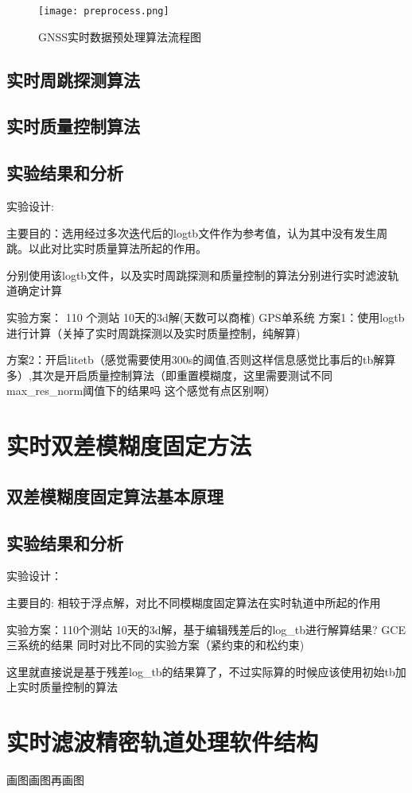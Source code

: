 \begin{figure}
  \centering
  \texttt{[image: preprocess.png]}
  \caption{GNSS实时数据预处理算法流程图}
  \label{fig:tb_flowchart}
\end{figure}

\subsection{实时周跳探测算法}

\subsection{实时质量控制算法}


\subsection{实验结果和分析}

实验设计:

主要目的：选用经过多次迭代后的log\underline{\space}tb文件作为参考值，认为其中没有发生周跳。以此对比实时质量算法所起的作用。

分别使用该log\underline{\space}tb文件，以及实时周跳探测和质量控制的算法分别进行实时滤波轨道确定计算

实验方案： 110 个测站 10天的3d解(天数可以商榷) GPS单系统
方案1：使用log\underline{\space}tb进行计算（关掉了实时周跳探测以及实时质量控制，纯解算)

方案2：开启litetb（感觉需要使用300s的阈值,否则这样信息感觉比事后的tb解算多）,其次是开启质量控制算法（即重置模糊度，这里需要测试不同max\_res\_norm阈值下的结果吗 这个感觉有点区别啊）

\section{实时双差模糊度固定方法}

\subsection{双差模糊度固定算法基本原理}

\subsection{实验结果和分析}

实验设计：

主要目的:
相较于浮点解，对比不同模糊度固定算法在实时轨道中所起的作用

实验方案：110个测站  10天的3d解，基于编辑残差后的log\_tb进行解算结果? GCE三系统的结果
同时对比不同的实验方案（紧约束的和松约束)

这里就直接说是基于残差log\_tb的结果算了，不过实际算的时候应该使用初始tb加上实时质量控制的算法

\section{实时滤波精密轨道处理软件结构}

画图画图再画图
